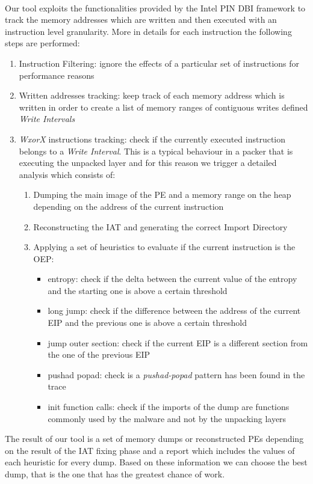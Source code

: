 \paragraph{}
Our tool exploits the functionalities provided by the Intel PIN \ac{DBI} framework to track the memory addresses which are written and then executed with an instruction level granularity.
More in details for each instruction the following steps are performed:
\begin{enumerate}
\item Instruction Filtering: ignore the effects of a particular set of instructions for performance reasons
\item Written addresses tracking: keep track of each memory address which is written in order to create a list of memory ranges of contiguous writes defined \textit{Write Intervals} 
\item \textit{\ac{WxorX}} instructions tracking: check if the currently executed instruction belongs to a \textit{Write Interval}. This is a typical behaviour in a packer that is executing the unpacked layer and for this reason we trigger a detailed analysis which consists of:
	\begin{enumerate}
	\item Dumping the main image of the \ac{PE} and a memory range on the heap depending on the address of the current instruction
	\item Reconstructing the \ac{IAT} and generating the correct Import Directory
	\item Applying a set of heuristics to evaluate if the current instruction is the \ac{OEP}:
		\begin{itemize}
			\item entropy: check if the delta between the current value of the entropy and the starting one is above a certain threshold
			\item long jump: check if the difference between the address of the current EIP and the previous one is above a certain threshold
			\item jump outer section: check if the current EIP is a different section from the 		one of the previous EIP
			\item pushad popad: check is a \textit{pushad-popad} pattern has been found in the trace
			\item init function calls: check if the imports of the dump are functions commonly used by the malware and not by the unpacking layers
		\end{itemize}
	\end{enumerate}
\end{enumerate}
The result of our tool is a set of memory dumps or reconstructed \acp{PE} depending on the result of the \ac{IAT} fixing phase and a report which includes the values of each heuristic for every dump. Based on these information we can choose the best dump, that is the one that has the greatest chance of work.


